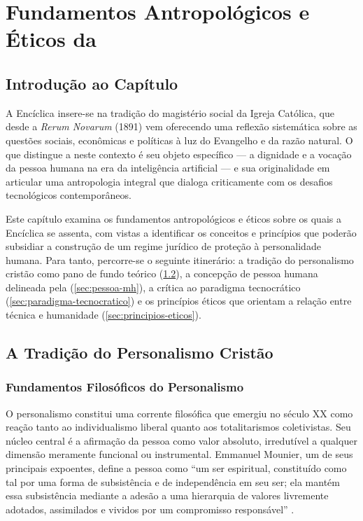 
\chapter{Fundamentos Antropológicos e Éticos da \MH{}}
\label{cap:fundamentos}

\section{Introdução ao Capítulo}
\label{sec:intro-cap2}

A Encíclica \MH{} insere-se na tradição do magistério social da Igreja Católica, que desde a \textit{Rerum Novarum} (1891) vem oferecendo uma reflexão sistemática sobre as questões sociais, econômicas e políticas à luz do Evangelho e da razão natural. O que distingue a \MH{} neste contexto é seu objeto específico --- a dignidade e a vocação da pessoa humana na era da inteligência artificial --- e sua originalidade em articular uma antropologia integral que dialoga criticamente com os desafios tecnológicos contemporâneos.

Este capítulo examina os fundamentos antropológicos e éticos sobre os quais a Encíclica se assenta, com vistas a identificar os conceitos e princípios que poderão subsidiar a construção de um regime jurídico de proteção à personalidade humana. Para tanto, percorre-se o seguinte itinerário: a tradição do personalismo cristão como pano de fundo teórico (\ref{sec:personalismo}), a concepção de pessoa humana delineada pela \MH{} (\ref{sec:pessoa-mh}), a crítica ao paradigma tecnocrático (\ref{sec:paradigma-tecnocratico}) e os princípios éticos que orientam a relação entre técnica e humanidade (\ref{sec:principios-eticos}).

\section{A Tradição do Personalismo Cristão}
\label{sec:personalismo}

\subsection{Fundamentos Filosóficos do Personalismo}
\label{subsec:fundamentos-personalismo}

O personalismo constitui uma corrente filosófica que emergiu no século XX como reação tanto ao individualismo liberal quanto aos totalitarismos coletivistas. Seu núcleo central é a afirmação da pessoa como valor absoluto, irredutível a qualquer dimensão meramente funcional ou instrumental. Emmanuel Mounier, um de seus principais expoentes, define a pessoa como ``um ser espiritual, constituído como tal por uma forma de subsistência e de independência em seu ser; ela mantém essa subsistência mediante a adesão a uma hierarquia de valores livremente adotados, assimilados e vividos por um compromisso responsável'' \cite{Mounier1949P}.

